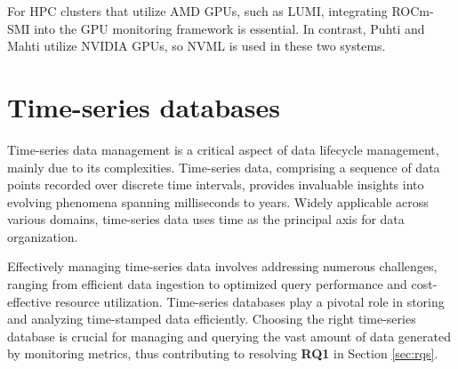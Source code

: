 For HPC clusters that utilize AMD GPUs, such as LUMI, integrating ROCm-SMI into the GPU monitoring framework is essential. In contrast, Puhti and Mahti utilize NVIDIA GPUs, so NVML is used in these two systems.

\section{Time-series databases}





Time-series data management is a critical aspect of data lifecycle management, mainly due to its complexities. Time-series data, comprising a sequence of data points recorded over discrete time intervals, provides invaluable insights into evolving phenomena spanning milliseconds to years. Widely applicable across various domains, time-series data uses time as the principal axis for data organization.

Effectively managing time-series data involves addressing numerous challenges, ranging from efficient data ingestion to optimized query performance and cost-effective resource utilization. Time-series databases play a pivotal role in storing and analyzing time-stamped data efficiently. Choosing the right time-series database is crucial for managing and querying the vast amount of data generated by monitoring metrics, thus contributing to resolving \textbf{RQ1} in Section \ref{sec:rqs}.

